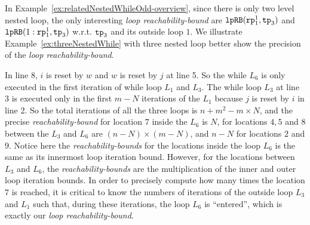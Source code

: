 In Example~\ref{ex:relatedNestedWhileOdd-overview}, since there is only two level nested loop,
the only interesting \emph{loop reachability-bound} are $\mathtt{lpRB}(\mathtt{rp}_1^1, \mathtt{tp}_3)$ and $\mathtt{lpRB}(1: \mathtt{rp}_1^1, \mathtt{tp}_3)$ 
w.r.t. $\mathtt{tp}_3$ and its outside loop $1$. We illustrate Example~\ref{ex:threeNestedWhile} with three nested loop better show the precision of the \emph{loop reachability-bound}.
\begin{example}
  \label{ex:threeNestedWhile}

In line 8, $i$ is reset by $w$ and $w$ is reset by $j$ at line 5. So the
while $L_6$ is only executed in the first iteration of while loop $L_1$ and $L_3$.
The while loop $L_3$ at line 3 is executed only in 
the first $m - N$ iterations of the 
$L_1$ because $j$ is reset by $i$ in line 2.
So the total iterations of all the three loops is
$n + m^2 - m \times N$,
and the precise \emph{reachability-bound} for location $7$ inside the $L_6$ is $N$,
for locations $4, 5$ and $8$ between the $L_3$ and $L_6$ are $(n-N) \times (m - N)$,
and $n - N$ for locations $2$ and $9$.
Notice here the \emph{reachability-bounds} for the locations inside the loop $L_6$ is 
the same as its innermost loop iteration bound.
However, for the locations between $L_3$ and $L_6$,
the \emph{reachability-bounds} are the multiplication of the inner and outer loop iteration bounds.
In order to precisely compute how many times the location $7$ is reached, it is critical to know
the numbers of iterations of the outside loop $L_3$ and $L_1$ such that,
during these iterations, the loop $L_6$ is ``entered'', which is exactly our \emph{loop reachability-bound}.


\end{example}
